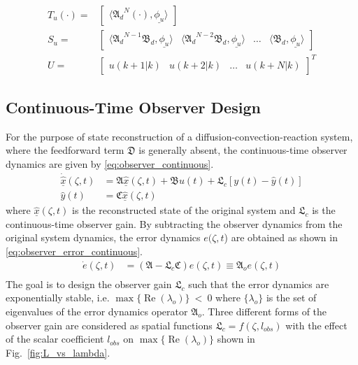 \begin{equation}
\begin{aligned}
        T_u (\cdot) = &\begin{bmatrix}
            \langle {\mathfrak{A}_d}^{N} (\cdot), \underline{\phi_u} \rangle
        \end{bmatrix} \\
        S_u = &\begin{bmatrix}
            \langle {\mathfrak{A}_d}^{N-1} \mathfrak{B}_d, \underline{\phi_u} \rangle & 
            \langle {\mathfrak{A}_d}^{N-2} \mathfrak{B}_d, \underline{\phi_u} \rangle &
            \hdots &
            \langle \mathfrak{B}_d, \underline{\phi_u} \rangle
        \end{bmatrix} \\
        U = &\begin{bmatrix}
            u(k+1|k) & u(k+2|k) & \hdots & u(k+N|k)
        \end{bmatrix}^T
    \end{aligned}
\end{equation}


\subsection{Continuous-Time Observer Design}
For the purpose of state reconstruction of a diffusion-convection-reaction system, where the feedforward term $\mathfrak{D}$ is generally absent, the continuous-time observer dynamics are given by \eqref{eq:observer_continuous}.
\begin{equation} \label{eq:observer_continuous}
    \begin{aligned}
        \dot{\underline{\hat{x}}}(\zeta, t) &= \mathfrak{A} \underline{\hat{x}}(\zeta, t) + \mathfrak{B} u(t) + \mathfrak{L}_c [y(t) - \hat{y}(t)] \\
        \hat{y}(t) &= \mathfrak{C} \underline{\hat{x}}(\zeta, t)
    \end{aligned}
\end{equation}
where $\underline{\hat{x}}(\zeta, t)$ is the reconstructed state of the original system and $\mathfrak{L}_c$ is the continuous-time observer gain. By subtracting the observer dynamics from the original system dynamics, the error dynamics $e(\zeta,t$) are obtained as shown in \eqref{eq:observer_error_continuous}.
\begin{equation} \label{eq:observer_error_continuous}
    \begin{aligned}
        \dot{e}(\zeta, t) &= (\mathfrak{A} - \mathfrak{L}_c \mathfrak{C}) e(\zeta, t) \equiv \mathfrak{A}_o e(\zeta,t) \\
    \end{aligned}
\end{equation}
The goal is to design the observer gain $\mathfrak{L}_c$ such that the error dynamics are exponentially stable, i.e. $\max\{\operatorname{Re}(\lambda_{o})\}~<~0$ where $\{\lambda_{o}\}$ is the set of eigenvalues of the error dynamics operator $\mathfrak{A}_o$. Three different forms of the observer gain are considered as spatial functions $\mathfrak{L}_c = f(\zeta, l_{obs})$ with the effect of the scalar coefficient $l_{obs}$ on $\max\{\operatorname{Re}(\lambda_{o})\}$ shown in Fig.~\ref{fig:L_vs_lambda}.

